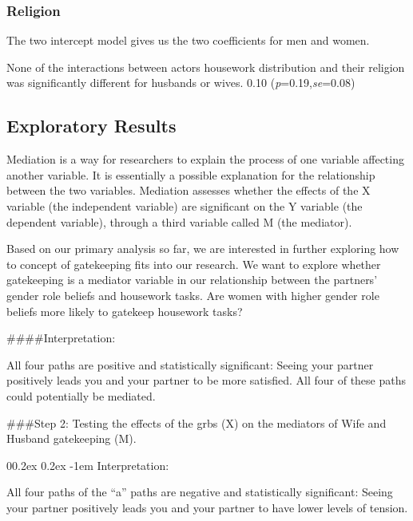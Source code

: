 \documentclass[
  english,
  man,floatsintext]{apa6}
\makeatletter
\let\oldparagraph\paragraph
\renewcommand{\paragraph}[1]{\oldparagraph{#1}\mbox{}}
\renewcommand{\paragraph}{\@startsection{paragraph}{4}{\parindent}%
  {0\baselineskip \@plus 0.2ex \@minus 0.2ex}%
  {-1em}%
  {\normalfont\normalsize\bfseries\itshape\typesectitle}}
\makeatother
\begin{document}
\hypertarget{religion}{%
\subsubsection{Religion}\label{religion}}

The two intercept model gives us the two coefficients for men and women.

None of the interactions between actors housework distribution and their religion was significantly different for husbands or wives. 0.10 (\emph{p}=0.19,\emph{se}=0.08)

\hypertarget{exploratory-results}{%
\subsection{Exploratory Results}\label{exploratory-results}}

Mediation is a way for researchers to explain the process of one variable affecting another variable. It is essentially a possible explanation for the relationship between the two variables. Mediation assesses whether the effects of the X variable (the independent variable) are significant on the Y variable (the dependent variable), through a third variable called M (the mediator).

Based on our primary analysis so far, we are interested in further exploring how to concept of gatekeeping fits into our research. We want to explore whether gatekeeping is a mediator variable in our relationship between the partners' gender role beliefs and housework tasks. Are women with higher gender role beliefs more likely to gatekeep housework tasks?

\#\#\#\#Interpretation:

All four paths are positive and statistically significant: Seeing your partner positively leads you and your partner to be more satisfied. All four of these paths could potentially be mediated.

\#\#\#Step 2: Testing the effects of the grbs (X) on the mediators of Wife and Husband gatekeeping (M).

\hypertarget{interpretation}{%
\paragraph{Interpretation:}\label{interpretation}}

All four paths of the \enquote{a} paths are negative and statistically significant: Seeing your partner positively leads you and your partner to have lower levels of tension.
\end{document}
